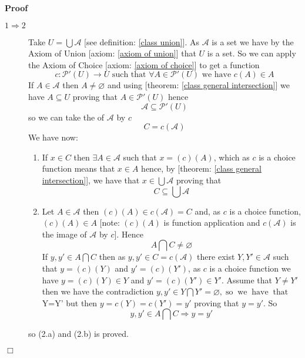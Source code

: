 \documentclass{book}
\newcommand{\tmop}[1]{\ensuremath{\operatorname{#1}}}
\newcommand{\tmtextbf}[1]{\text{{\bfseries{#1}}}}
\newenvironment{enumeratealpha}{\begin{enumerate}[a{\textup{)}}] }{\end{enumerate}}
\newenvironment{proof}{\noindent\textbf{Proof\ }}{\hspace*{\fill}$\Box$\medskip}
\begin{document}
\begin{proof}
  
  \begin{description}
    \item[$1 \Rightarrow 2$] Take $U = \bigcup \mathcal{A}$ [see definition:
    \ref{class union}]. As $\mathcal{A}$ is a set we have by the Axiom of
    Union [axiom: \ref{axiom of union}] that $U$ is a set. So we can apply the
    Axiom of Choice [axiom: \ref{axiom of choice}] to get a function
    \[ c : \mathcal{P}' (U) \rightarrow U \text{ such that } \forall A \in
       \mathcal{P}' (U)  \text{ we have } c (A) \in A \]
    If $A \in \mathcal{A}$ then $A \neq \varnothing$ and using [theorem:
    \ref{class general intersection}] we have $A \subseteq U$ proving that $A
    \in \mathcal{P}' (U)$ hence
    \[ \mathcal{A} \subseteq \mathcal{P}' (U) \]
    so we can take the \tmtextbf{image} of $\mathcal{A}$ by $c$
    \[ C = c (\mathcal{A}) \]
    We have now:
    \begin{enumeratealpha}
      \item If $x \in C$ then $\exists A \in \mathcal{A}$ such that $x = (c)
      (A)$, which as $c$ is a choice function means that $x \in A$ hence, by
      [theorem: \ref{class general intersection}], we have that $x \in \bigcup
      \mathcal{A}$ proving that
      \[ C \subseteq \bigcup \mathcal{A} \]
      \item Let $A \in \mathcal{A}$ then $(c) (A) \in c (\mathcal{A}) = C$
      and, as $c$ is a choice function, $(c) (A) \in A$ [note: $(c) (A)$ is
      function application and $c (\mathcal{A})$ is the image of $\mathcal{A}$
      by $c$]. Hence
      \[ A \bigcap C \neq \varnothing \]
      If $y, y' \in A \bigcap C$ then as $y, y' \in C = c (\mathcal{A})$ there
      exist $Y, Y' \in \mathcal{A}$ such that $y = (c) (Y)$ and $y' = (c)
      (Y')$, as $c$ is a choice function we have $y = (c) (Y) \in Y$ and $y' =
      (c) (Y') \in Y'$. Assume that $Y \neq Y'$ then we have the contradiction
      $y, y' \in Y \bigcap Y' = \varnothing, \tmop{so} \tmop{we} \tmop{have}
      \tmop{that}$Y=Y' but then $y = c (Y) = c (Y') = y'$ proving that $y = y'
      .$ So
      \[ y, y' \in A \bigcap C \Rightarrow y = y' \]
    \end{enumeratealpha}
    so (2.a) and (2.b) is proved.
    

\end{description}
\end{proof}
\end{document}
